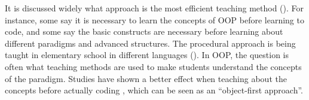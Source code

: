 It is discussed widely what approach is the most efficient teaching method (). For instance, some say it is necessary to learn the concepts of OOP before learning to code, and some say the basic constructs are necessary before learning about different paradigms and advanced structures. The procedural approach is being taught in elementary school in different languages (). In OOP, the question is often what teaching methods are used to make students understand the concepts of the paradigm. Studies have shown a better effect when teaching about the concepts before actually coding \cite{Xinogalos15}, which can be seen as an ``object-first approach''.



